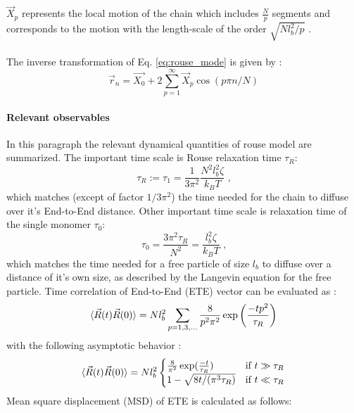 \documentclass[
    paper=A4,pagesize=automedia,fontsize=12pt,
    BCOR=15mm,DIV=22,
    twoside,headinclude,footinclude=false,
    fleqn,             %
    bibliography=totocnumbered,          %
    listof=totoc,                %
    listof=flat,                 %
    cleardoublepage=empty      %
    numbers=endperiod
]{scrartcl}
\begin{document}
$\vec{X}_p$ represents the local motion of the chain which includes $\frac{N}{p}$ segments and corresponds to the
motion with the length-scale of the order $\sqrt{Nl_b^2/p}$ \cite{Doi_Edwards_PD:1994}.
\\
\\
The inverse transformation of Eq. \ref{eq:rouse_mode} is given by \cite{Doi_Edwards_PD:1994}:
\begin{equation}
    \vec{r}_n = \vec{X_0} + 2 \sum_{p=1}^{\infty} \vec{X}_p \cos(p \pi n  / N)
\end{equation}

\paragraph{Relevant observables}
In this paragraph the relevant dynamical quantities of rouse model are summarized. 
The important time scale is Rouse relaxation time $\tau_R$:
\begin{equation} \label{eq:rouse_relaxation_time}
    \tau_R := \tau_1 = \frac{1}{3 \pi^2} \frac{N^2 l_b^2 \zeta}{k_B T} \text{ ,}
\end{equation}
which matches (except of factor $1/3\pi^2$) the time needed for the chain to diffuse over 
it's End-to-End distance. Other important time scale is relaxation time of the single monomer $\tau_0$:
\begin{equation} \label{eq:rouse_tau_0}
    \tau_0 = \frac{3 \pi^2 \tau_R}{N^2} = \frac{l_b^2 \zeta}{k_B T} \text{ ,}
\end{equation}
which matches the time needed for a free particle of size $l_b$ to diffuse over a distance
of it's own size, as described by the Langevin equation for the free particle.
Time correlation of End-to-End (ETE) vector can be evaluated as \cite{Doi_Edwards_PD:1994}:
\begin{equation}
    \langle\vec{R}(t)\vec{R}(0)\rangle = Nl_b^2 \sum_{p=1,3,\ldots} \frac{8}{p^2\pi^2}\exp\left(\frac{-t p^2}{\tau_R}\right)
\end{equation}
with the following asymptotic behavior \cite{Nikoubashman2016}:
\begin{equation}
    \langle\vec{R}(t)\vec{R}(0)\rangle = Nl_b^2 \begin{cases}
        \frac{8}{\pi^2} \exp(\frac{-t}{\tau_R}) & \text{if } t \gg \tau_R \\
        1 - \sqrt{8t/(\pi^3\tau_R)} & \text{if } t \ll \tau_R
    \end{cases}
\end{equation}
Mean square displacement (MSD) of ETE is calculated as follows:
\end{document}

